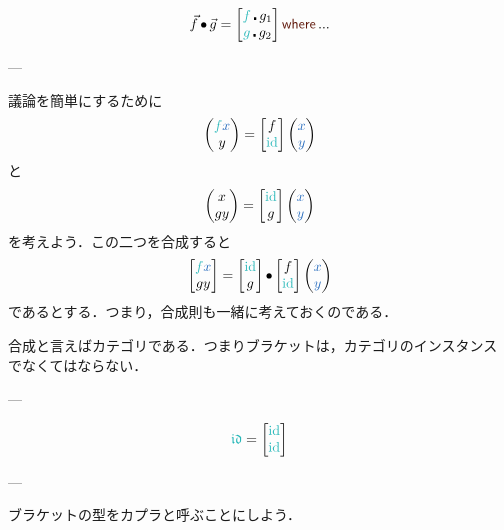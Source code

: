 \documentclass[a5paper,twoside,fleqn,draft]{jsbook}
\begin{document}
\begin{equation}
  \mArrow{f}\mCompCat\mArrow{g}
  =
  \begin{bmatrix}
    \hFunc{f}\hCompose g_1\\
    \hFunc{g}\hCompose g_2
  \end{bmatrix}
  \mWhere...
\end{equation}

---

議論を簡単にするために
\begin{equation}
  \mPairWith{\hFunc{f}\hVar{x}}{y}
  =\begin{bmatrix}
  f\\
  \mId
  \end{bmatrix}
  \mPairWith{\hVar{x}}{\hVar{y}}
\end{equation}
と
\begin{equation}
  \mPairWith{x}{gy}
  =\begin{bmatrix}
  \mId\\
  g
  \end{bmatrix}
  \mPairWith{\hVar{x}}{\hVar{y}}
\end{equation}
を考えよう．この二つを合成すると
\begin{equation}
  \begin{bmatrix}
    \hFunc{f}\hVar{x}\\
    gy
  \end{bmatrix}
  =
  \begin{bmatrix}
    \mId\\
    g
  \end{bmatrix}
  \mCompCat
  \begin{bmatrix}
    f\\
    \mId
  \end{bmatrix}
  \mPairWith{\hVar{x}}{\hVar{y}}
\end{equation}
であるとする．つまり，合成則も一緒に考えておくのである．

合成と言えばカテゴリである．つまりブラケットは，カテゴリのインスタンス
でなくてはならない．

---

\begin{equation}
  \mIdCat
  =
  \begin{bmatrix}
    \mId\\
    \mId
  \end{bmatrix}
\end{equation}

---

ブラケットの型をカプラと呼ぶことにしよう．
\end{document}
